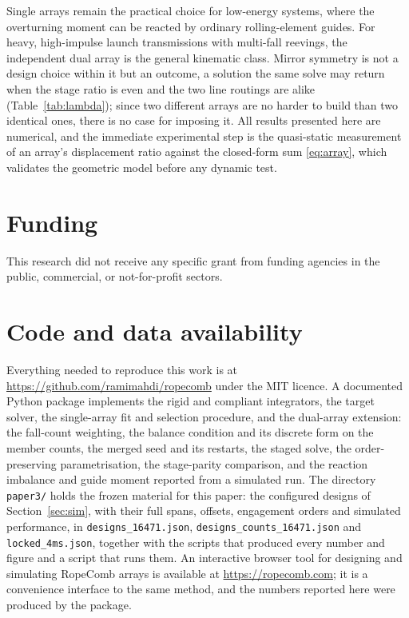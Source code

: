 \documentclass[preprint,12pt,number]{elsarticle}
\begin{document}
Single arrays remain the practical choice for low-energy systems, where the overturning moment can be reacted by ordinary rolling-element guides. For heavy, high-impulse launch transmissions with multi-fall reevings, the independent dual array is the general kinematic class. Mirror symmetry is not a design choice within it but an outcome, a solution the same solve may return when the stage ratio is even and the two line routings are alike (Table~\ref{tab:lambda}); since two different arrays are no harder to build than two identical ones, there is no case for imposing it. All results presented here are numerical, and the immediate experimental step is the quasi-static measurement of an array's displacement ratio against the closed-form sum \eqref{eq:array}, which validates the geometric model before any dynamic test.


\section*{Funding}

This research did not receive any specific grant from funding agencies in the public, commercial, or not-for-profit sectors.

\section*{Code and data availability}

Everything needed to reproduce this work is at \url{https://github.com/ramimahdi/ropecomb} under the MIT licence. A documented Python package implements the rigid and compliant integrators, the target solver, the single-array fit and selection procedure, and the dual-array extension: the fall-count weighting, the balance condition and its discrete form on the member counts, the merged seed and its restarts, the staged solve, the order-preserving parametrisation, the stage-parity comparison, and the reaction imbalance and guide moment reported from a simulated run. The directory \texttt{paper3/} holds the frozen material for this paper: the configured designs of Section~\ref{sec:sim}, with their full spans, offsets, engagement orders and simulated performance, in \texttt{designs\_16471.json}, \texttt{designs\_counts\_16471.json} and \texttt{locked\_4ms.json}, together with the scripts that produced every number and figure and a script that runs them. An interactive browser tool for designing and simulating RopeComb arrays is available at \url{https://ropecomb.com}; it is a convenience interface to the same method, and the numbers reported here were produced by the package.
\end{document}
